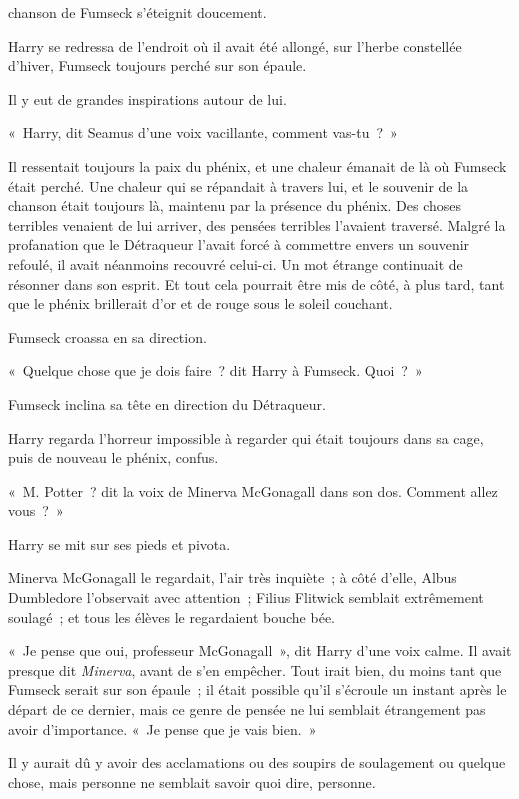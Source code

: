 
 chanson de Fumseck s'éteignit doucement.

\hplettrineextrapara
Harry se redressa de l'endroit où il avait été allongé, sur l'herbe constellée d'hiver, Fumseck toujours perché sur son épaule.

Il y eut de grandes inspirations autour de lui.

«~Harry, dit Seamus d'une voix vacillante, comment vas-tu~?~»

Il ressentait toujours la paix du phénix, et une chaleur émanait de là où Fumseck était perché. Une chaleur qui se répandait à travers lui, et le souvenir de la chanson était toujours là, maintenu par la présence du phénix. Des choses terribles venaient de lui arriver, des pensées terribles l'avaient traversé. Malgré la profanation que le Détraqueur l'avait forcé à commettre envers un souvenir refoulé, il avait néanmoins recouvré celui-ci. Un mot étrange continuait de résonner dans son esprit. Et tout cela pourrait être mis de côté, à plus tard, tant que le phénix brillerait d'or et de rouge sous le soleil couchant.

Fumseck croassa en sa direction.

«~Quelque chose que je dois faire~? dit Harry à Fumseck. Quoi~?~»

Fumseck inclina sa tête en direction du Détraqueur.

Harry regarda l'horreur impossible à regarder qui était toujours dans sa cage, puis de nouveau le phénix, confus.

«~M. Potter~? dit la voix de Minerva McGonagall dans son dos. Comment allez vous~?~»

Harry se mit sur ses pieds et pivota.

Minerva McGonagall le regardait, l'air très inquiète~; à côté d'elle, Albus Dumbledore l'observait avec attention~; Filius Flitwick semblait extrêmement soulagé~; et tous les élèves le regardaient bouche bée.

«~Je pense que oui, professeur McGonagall~», dit Harry d'une voix calme. Il avait presque dit \emph{Minerva}, avant de s'en empêcher. Tout irait bien, du moins tant que Fumseck serait sur son épaule~; il était possible qu'il s'écroule un instant après le départ de ce dernier, mais ce genre de pensée ne lui semblait étrangement pas avoir d'importance. «~Je pense que je vais bien.~»

Il y aurait dû y avoir des acclamations ou des soupirs de soulagement ou quelque chose, mais personne ne semblait savoir quoi dire, personne.

